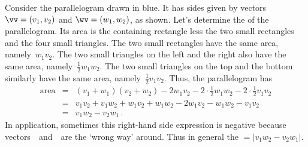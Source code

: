 \begin{figure} 
\end{figure}
Consider the parallelogram drawn in blue.
It has sides given by vectors \(\vv=(v_1,v_2)\) and \(\wv=(w_1,w_2)\), as shown.
Let's determine the  of the parallelogram. 
Its area is the containing rectangle less the two small rectangles and the four small triangles.
The two small rectangles have the same area, namely~\(w_1v_2\).
The two small triangles on the left and the right also have the same area, namely~\(\frac12w_1w_2\).
The two small triangles on the top and the bottom similarly have the same area, namely~\(\frac12v_1v_2\).
Thus, the parallelogram has 
\begin{eqnarray*}
\text{area}&=&(v_1+w_1)(v_2+w_2)-2w_1v_2-2\cdot\frac12w_1w_2-2\cdot\frac12v_1v_2
\nonumber
\\&=&v_1v_2+v_1w_2+w_1v_2+w_1w_2-2w_1v_2-w_1w_2-v_1v_2
\nonumber
\\&=&v_1w_2-v_2w_1\,. %
\end{eqnarray*}
In application, sometimes this right-hand side expression is negative because vectors~\vv\ and~\wv\ are the `wrong way' around.
Thus in general the \({}=|v_1w_2-v_2w_1|\).


